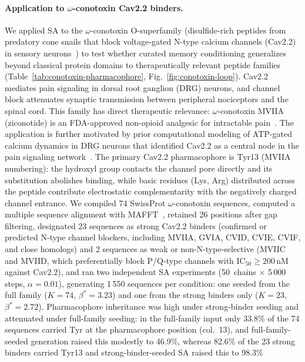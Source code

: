 \paragraph{Application to $\omega$-conotoxin Cav2.2 binders.}
We applied SA to the $\omega$-conotoxin O-superfamily (disulfide-rich peptides from predatory
cone snails that block voltage-gated N-type calcium channels (Cav2.2) in sensory
neurons~\cite{omegaConotoxinSAR2006}) to test whether curated memory conditioning generalizes
beyond classical protein domains to therapeutically relevant peptide families
(Table~\ref{tab:conotoxin-pharmacophore}, Fig.~\ref{fig:conotoxin-loop}). Cav2.2 mediates pain signaling in dorsal root ganglion (DRG) neurons, and channel block attenuates
synaptic transmission between peripheral nociceptors and the spinal cord. This family has direct
therapeutic relevance: $\omega$-conotoxin MVIIA (ziconotide) is an FDA-approved non-opioid
analgesic for intractable pain~\cite{ziconotideReview2004}. The application is further motivated by prior
computational modeling of ATP-gated calcium dynamics in DRG neurons that identified Cav2.2 as a
central node in the pain signaling network~\cite{songModelingAnalysis2009}. The primary Cav2.2
pharmacophore is Tyr13 (MVIIA numbering): the hydroxyl group contacts the channel pore directly
and its substitution abolishes binding, while basic residues (Lys, Arg) distributed across the
peptide contribute electrostatic complementarity with the negatively charged channel entrance.
We compiled 74 SwissProt $\omega$-conotoxin sequences, computed a multiple sequence alignment
with MAFFT~\cite{mafft2013}, retained 26 positions after gap filtering, designated 23 sequences
as strong Cav2.2 binders (confirmed or predicted N-type channel blockers, including MVIIA,
GVIA, CVID, CVIE, CVIF, and close homologs) and 2 sequences as weak or non-N-type-selective
(MVIIC and MVIID, which preferentially block P/Q-type channels with
IC$_{50} \geq 200$\,nM against Cav2.2), and ran two independent SA experiments (50~chains
$\times$ 5\,000 steps, $\alpha = 0.01$), generating 1\,550 sequences per condition: one seeded
from the full family ($K = 74$, $\beta^{*} = 3.23$) and one from the strong binders only
($K = 23$, $\beta^{*} = 2.72$). Pharmacophore inheritance was high under
strong-binder seeding and attenuated under full-family seeding: in the full-family
input only 33.8\% of the 74 sequences carried Tyr at the pharmacophore position (col.~13), and
full-family-seeded generation raised this modestly to 46.9\%, whereas 82.6\% of the 23 strong
binders carried Tyr13 and strong-binder-seeded SA raised this to 98.3\%

